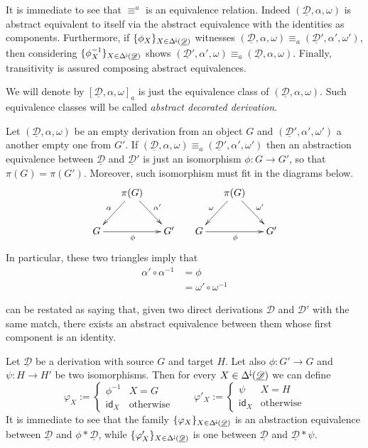 \documentclass[a4paper,UKenglish,cleveref,pdftex, thm-restate,numberwithinsect]{lipics}
\newcommand{\Deltamin}{\Delta^{\hspace{-1pt}\downarrow\hspace{-1pt}}}
\newcommand{\id}[1]{\mathsf{id}_{#1}}
\newcommand{\dder}[1]{\mathscr{#1}}
\newcommand{\der}[1]{\underline{\dder{#1}}}
\begin{document}
\begin{remark}\label{rem:equi}
	It is immediate to see that $\equiv^a$ is an equivalence relation. Indeed $(\der{D}, \alpha, \omega)$ is abstract equivalent to itself via the abstract equivalence with the identities as components. Furthermore, if  $\{\phi_X\}_{X\in \Deltamin(\der{D})}$  witnesses $(\der{D}, \alpha, \omega)\equiv_a (\der{D}', \alpha', \omega')$, then considering $\{\phi^{-1}_X\}_{X\in \Deltamin(\der{D})}$ shows $(\der{D}', \alpha', \omega)\equiv_a (\der{D}, \alpha, \omega)$. Finally, transitivity is assured composing abstract equivalences. 
	
	We will denote by $[\der{D}, \alpha, \omega]_a$ is just the equivalence class of  $(\der{D}, \alpha, \omega)$.
	 Such equivalence classes will be called  \emph{abstract decorated derivation}.  
\end{remark}

\begin{remark}\label{rem:empty}
Let $(\der{D},\alpha, \omega)$ be an empty derivation from an object $G$ and  $(\der{D}',\alpha', \omega')$ a another empty one from $G'$.  If $(\der{D},\alpha, \omega)\equiv_a(\der{D}',\alpha', \omega')$ then an abstraction equivalence between $\der{D}$ and $\der{D}'$ is just an isomorphism $\phi\colon G\to G'$, so that $\pi(G)=\pi(G')$. Moreover, such isomorphism must fit in the diagrams below.
\[\xymatrix@C=15pt{&\pi(G) \ar[dr]^{\alpha'} \ar[dl]_{\alpha}&&& \pi(G) \ar[dr]^{\omega'} \ar[dl]_{\omega}\\ G\ar[rr]_{\phi} && G' &G \ar[rr]_{\phi} && G' } \]
In particular, these two triangles imply that
\begin{align*}
	\alpha'\circ \alpha^{-1}&=\phi \\&=\omega'\circ \omega^{-1}
\end{align*}
\end{remark}

\begin{remark}\label{rem:res}  can be restated as saying that, given two direct derivations $\dder{D}$ and $\dder{D'}$ with the same match, there exists an abstract equivalence between them whose first component is an identity.
\end{remark}

\begin{remark}\label{rem:absequi}
	Let $\der{D}$ be a derivation with source $G$ and target $H$. Let also $\phi\colon G'\to G$ and $\psi\colon H\to H'$ be two isomorphisms. Then for every $X\in \Deltamin(\der{D})$ we can define 
	\[\varphi_X:=\begin{cases}
		\phi^{-1} & X=G\\
		\id{X} & \text{otherwise}
	\end{cases} \qquad \varphi'_X:=\begin{cases}
	\psi & X=H\\
	\id{X} & \text{otherwise}
	\end{cases}\]
It is immediate to see that the family $\{\varphi_X\}_{X\in \Deltamin(\der{D})}$ is an abstraction equivalence between $\der{D}$ and $\phi *\der{D}$, while $\{\varphi'_X\}_{X\in \Deltamin(\der{D})}$ is one between $\der{D}$ and $\der{D}*\psi$.
\end{remark}
\end{document}

